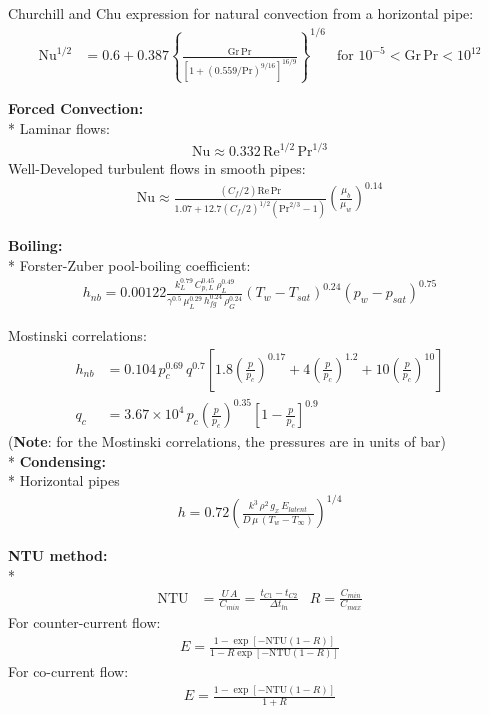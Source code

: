 \begin{datasheet}
Churchill and Chu expression for natural convection from a
horizontal pipe:
\begin{align*}
  \text{Nu}^{1/2} &= 0.6 + 0.387
  \left\{\frac{\text{Gr}\,\text{Pr}}{\left[1 + \left(0.559 /
          \text{Pr}\right)^{9/16}\right]^{16/9}}\right\}^{1/6} &
  \text{for $10^{-5}<\text{Gr}\,\text{Pr}<10^{12}$}
\end{align*}%

{\bf Forced Convection:}\\*
Laminar flows:
\begin{align*}
  \text{Nu} \approx 0.332\,\text{Re}^{1/2}\,\text{Pr}^{1/3}
\end{align*}
Well-Developed turbulent flows in smooth pipes:
\begin{align*}
  \text{Nu} \approx \frac{(C_f/2)
    \text{Re}\,\text{Pr}}{1.07+12.7(C_f/2)^{1/2}\left(\text{Pr}^{2/3}
      -1\right)}\left(\frac{\mu_b}{\mu_w}\right)^{0.14}
\end{align*}

{\bf Boiling:}\\*
Forster-Zuber pool-boiling coefficient:
\begin{align*}
  h_{nb}=0.00122\frac{k_L^{0.79}\, C_{p,L}^{0.45}\, \rho_L^{0.49}}{\gamma^{0.5}\,\mu_L^{0.29}\,h_{fg}^{0.24}\,\rho_G^{0.24}}\left(T_w - T_{sat}\right)^{0.24}\left(p_w-p_{sat}\right)^{0.75}
\end{align*}

Mostinski correlations: 
\begin{align*}
  h_{nb} &= 0.104\,p_c^{0.69}\,q^{0.7}\left[1.8\left(\frac{p}{p_c}\right)^{0.17}+4\left(\frac{p}{p_c}\right)^{1.2}+10\left(\frac{p}{p_c}\right)^{10}\right]\\
  q_c &=
  3.67\times10^4\,p_c\left(\frac{p}{p_c}\right)^{0.35}\left[1-\frac{p}{p_c}\right]^{0.9}
\end{align*}
({\bf Note}: for the Mostinski correlations, the pressures are in units of bar)\\*
{\bf Condensing:}\\*
Horizontal pipes
\begin{align*}
  h = 0.72
  \left(\frac{k^3\,\rho^2\,g_x\,E_{latent}}{D\,\mu\,\left(T_w-T_\infty\right)}\right)^{1/4}
\end{align*}

{\bf NTU method:}\\*
\begin{align*}
  \text{NTU} &= \frac{U\,A}{C_{min}}=\frac{t_{C1}-t_{C2}}{\Delta t_{ln}} & R =\frac{C_{min}}{C_{max}}
\end{align*}
For counter-current flow:
\begin{align*}
  E = \frac{1-\exp\left[-\text{NTU}(1-R)\right]}{1-R\exp\left[-\text{NTU}(1-R)\right]}
\end{align*}
For co-current flow:
\begin{align*}
  E = \frac{1-\exp\left[-\text{NTU}(1-R)\right]}{1+R}
\end{align*}


\end{datasheet}
